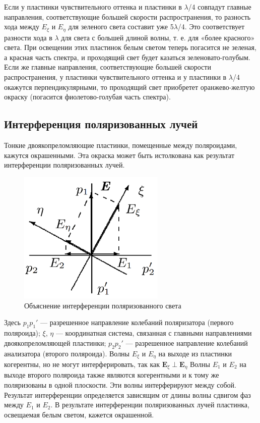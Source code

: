 \documentclass[12pt,a4paper]{article}
\begin{document}
	Если у пластинки чувствительного оттенка и пластинки в $\lambda$/4 совпадут главные направления, соответствующие большей скорости распространения, то разность хода между $E_{\xi}$ и $E_{\eta}$ для зеленого света составит уже 5$\lambda$/4. Это соответствует разности хода в $\lambda$ для света с большей длиной волны, т. е. для «более красного» света. При освещении этих пластинок белым светом теперь погасится не зеленая, а красная часть спектра, и проходящий свет будет казаться зеленовато-голубым. Если же главные направления, соответствующие большей скорости распространения, у пластинки чувствительного оттенка и у пластинки в $\lambda$/4 окажутся перпендикулярными, то проходящий свет приобретет оранжево-желтую окраску (погасится фиолетово-голубая часть спектра).
	
	\subsection*{Интерференция поляризованных лучей} Тонкие двоякопреломляющие пластинки, помещенные между поляроидами, кажутся окрашенными. Эта окраска может быть истолкована как результат интерференции поляризованных лучей.
	\begin{figure}[h!]
		\centering
		\includegraphics[width=7cm]{res/Interference}
		\caption{Объяснение интерференции поляризованного света}
	\end{figure}


	Здесь $p_1 p_1'$ — разрешенное направление колебаний поляризатора (первого поляроида); $\xi$, $\eta$ — координатная система, связанная с главными направлениями двоякопреломляющей пластинки; $p_2 p_2'$ — разрешенное направление колебаний анализатора (второго поляроида). Волны $E_\xi$ и $E_\eta$ на выходе из пластинки когерентны, но не могут интерферировать, так как $\boldsymbol{E}_\xi \perp \boldsymbol{E}_\eta$ Волны $E_1$ и $E_2$ на выходе второго поляроида также являются когерентными и к тому же поляризованы в одной плоскости. Эти волны интерферируют между собой. Результат интерференции определяется зависящим от длины волны сдвигом фаз между $E_1$ и $E_2$. В результате интерференции поляризованных лучей пластинка, освещаемая белым светом, кажется окрашенной.
	
\end{document}
